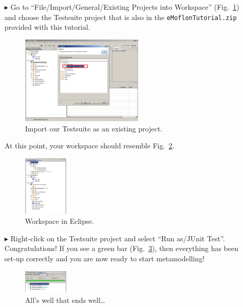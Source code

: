 \begin{enumerate}
\item[$\blacktriangleright$] Go to ``File/Import/General/Existing Projects
into Workspace'' (Fig.~\ref{fig_eclipseTestsuiteImport}) and choose the
Testsuite project that is also in the \texttt{eMoflonTutorial.zip} provided
with this tutorial. 
\begin{figure}[!h]
	\centering
  \includegraphics[width=0.55\textwidth]{pics/eclipse_testsuitimport.png}
	\caption{Import our Testsuite as an existing project.}
	\label{fig_eclipseTestsuiteImport}
\end{figure}

\newpage 

\item[] At this point, your workspace should resemble
Fig.~\ref{fig_eclipsepackageexplorer}.
\begin{figure}[!h]
	\centering
  \includegraphics[width=0.2\textwidth]{pics/eclipse_packageexplorer.png}
	\caption{Workspace in Eclipse.}
	\label{fig_eclipsepackageexplorer}
\end{figure}

\item[$\blacktriangleright$] Right-click on the Testsuite project and select
``Run as/JUnit Test''.
Congratulations!  If you see a green bar  (Fig.~\ref{fig_eclipsetestsuiterun}),
then everything has been set-up correctly and you are now ready to start
metamodelling!
\begin{figure}[!h]
	\centering
  \includegraphics[width=0.2\textwidth]{pics/eclipse_testsuiterun.png}
	\caption{All's well that ends well\ldots}
	\label{fig_eclipsetestsuiterun}
\end{figure}
\end{enumerate}



